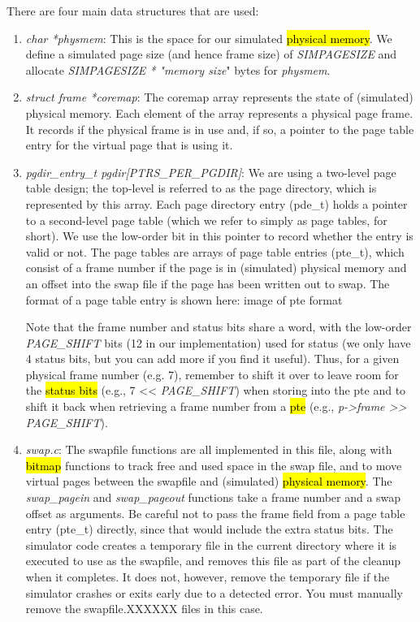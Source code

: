 \documentclass[12pt]{article}
\begin{document}
\bigskip

There are four main data structures that are used:

\bigskip

\begin{enumerate}[1.]
    \item \textit{char *physmem}: This is the space for our simulated \hl{physical memory}.
    We define a simulated page size (and hence frame size) of \textit{SIMPAGESIZE} and
    allocate \textit{SIMPAGESIZE * "memory size}" bytes for \textit{physmem}.
    \item \textit{struct frame *coremap}: The coremap array represents the state
    of (simulated) physical memory. Each element of the array represents a physical
    page frame. It records if the physical frame is in use and, if so, a pointer
    to the page table entry for the virtual page that is using it.
    \item \textit{pgdir\_entry\_t pgdir[PTRS\_PER\_PGDIR]}: We are using a two-level page table design; the top-level is referred to as the page directory, which is represented by this array. Each page directory entry (pde\_t) holds a pointer to a second-level page table (which we refer to simply as page tables, for short). We use the low-order bit in this pointer to record whether the entry is valid or not. The page tables are arrays of page table entries (pte\_t), which consist of a frame number if the page is in (simulated) physical memory and an offset into the swap file if the page has been written out to swap. The format of a page table entry is shown here: image of pte format

    \bigskip

    Note that the frame number and status bits share a word, with the low-order
    \textit{PAGE\_SHIFT} bits (12 in our implementation) used for status (we only
    have 4 status bits, but you can add more if you find it useful). Thus, for a
    given physical frame number (e.g. 7), remember to shift it over to leave room
    for the \hl{status bits} (e.g., 7 << \textit{PAGE\_SHIFT}) when storing into
    the pte and to shift it back when retrieving a frame number from a \hl{pte}
    (e.g., \textit{p->frame >> PAGE\_SHIFT}).

    \item \textit{swap.c}: The swapfile functions are all implemented in this
    file, along with \hl{bitmap} functions to track free and used space in the swap
    file, and to move virtual pages between the swapfile and (simulated)
    \hl{physical memory}. The \textit{swap\_pagein} and \textit{swap\_pageout}
    functions take a frame number and a swap offset as arguments. Be careful not
    to pass the frame field from a page table entry (pte\_t) directly, since that
    would include the extra status bits. The simulator code creates a temporary
    file in the current directory where it is executed to use as the swapfile,
    and removes this file as part of the cleanup when it completes. It does not,
    however, remove the temporary file if the simulator crashes or exits early
    due to a detected error. You must manually remove the swapfile.XXXXXX files
    in this case.
\end{enumerate}
\end{document}

